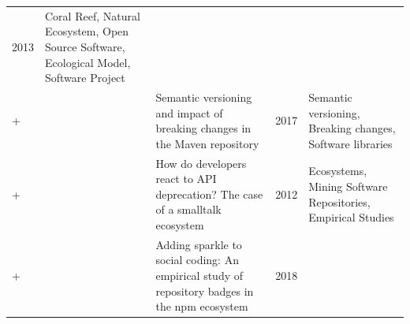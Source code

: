 \documentclass[]{book}
\begin{document}
\begin{longtable}[]{@{}lllll@{}}
\begin{minipage}[t]{0.02\columnwidth}
2013\strut
\end{minipage} & \begin{minipage}[t]{0.39\columnwidth}\raggedright\strut
Coral Reef, Natural Ecosystem, Open Source Software, Ecological Model,
Software Project\strut
\end{minipage}\tabularnewline
\begin{minipage}[t]{0.01\columnwidth}\raggedright\strut
+\strut
\end{minipage} & \begin{minipage}[t]{0.09\columnwidth}\raggedright\strut
\citet{Raemaekers2017}\strut
\end{minipage} & \begin{minipage}[t]{0.34\columnwidth}\raggedright\strut
Semantic versioning and impact of breaking changes in the Maven
repository\strut
\end{minipage} & \begin{minipage}[t]{0.02\columnwidth}\raggedright\strut
2017\strut
\end{minipage} & \begin{minipage}[t]{0.39\columnwidth}\raggedright\strut
Semantic versioning, Breaking changes, Software libraries\strut
\end{minipage}\tabularnewline
\begin{minipage}[t]{0.01\columnwidth}\raggedright\strut
+\strut
\end{minipage} & \begin{minipage}[t]{0.09\columnwidth}\raggedright\strut
\citet{Robbes2012}\strut
\end{minipage} & \begin{minipage}[t]{0.34\columnwidth}\raggedright\strut
How do developers react to API deprecation? The case of a smalltalk
ecosystem\strut
\end{minipage} & \begin{minipage}[t]{0.02\columnwidth}\raggedright\strut
2012\strut
\end{minipage} & \begin{minipage}[t]{0.39\columnwidth}\raggedright\strut
Ecosystems, Mining Software Repositories, Empirical Studies\strut
\end{minipage}\tabularnewline
\begin{minipage}[t]{0.01\columnwidth}\raggedright\strut
+\strut
\end{minipage} & \begin{minipage}[t]{0.09\columnwidth}\raggedright\strut
\citet{Trockman2018}\strut
\end{minipage} & \begin{minipage}[t]{0.34\columnwidth}\raggedright\strut
Adding sparkle to social coding: An empirical study of repository badges
in the npm ecosystem\strut
\end{minipage} & \begin{minipage}[t]{0.02\columnwidth}\raggedright\strut
2018\strut
\end{minipage} & \begin{minipage}[t]{0.39\columnwidth}\raggedright\strut
\strut
\end{minipage}\tabularnewline
\bottomrule
\end{longtable}
\end{document}
